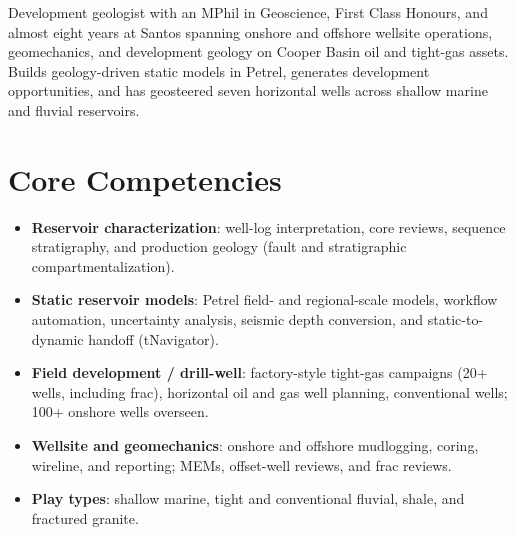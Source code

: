 \documentclass[11pt,a4paper,sans]{moderncv}
\begin{document}
\makecvtitle

\vspace{6pt}
\small{Development geologist with an MPhil in Geoscience, First Class Honours, and almost eight years at Santos spanning onshore and offshore wellsite operations, geomechanics, and development geology on Cooper Basin oil and tight-gas assets. Builds geology-driven static models in Petrel, generates development opportunities, and has geosteered seven horizontal wells across shallow marine and fluvial reservoirs.}

\section{Core Competencies}
\vspace{1pt}
\begin{itemize}

\item \textbf{Reservoir characterization}: well-log interpretation, core reviews, sequence stratigraphy, and production geology (fault and stratigraphic compartmentalization).

\item \textbf{Static reservoir models}: Petrel field- and regional-scale models, workflow automation, uncertainty analysis, seismic depth conversion, and static-to-dynamic handoff (tNavigator).

\item \textbf{Field development / drill-well}: factory-style tight-gas campaigns (20+ wells, including frac), horizontal oil and gas well planning, conventional wells; 100+ onshore wells overseen.

\item \textbf{Wellsite and geomechanics}: onshore and offshore mudlogging, coring, wireline, and reporting; MEMs, offset-well reviews, and frac reviews.

\item \textbf{Play types}: shallow marine, tight and conventional fluvial, shale, and fractured granite.

\end{itemize}
\end{document}
